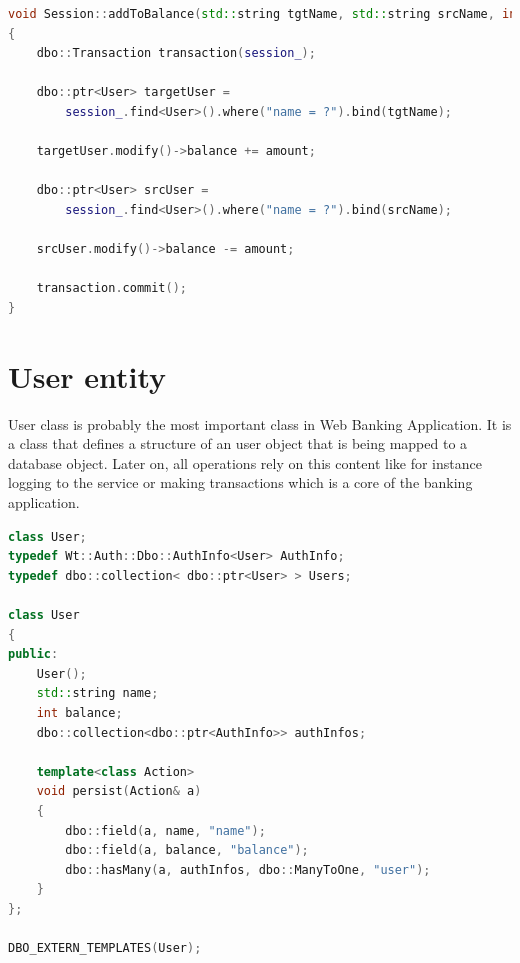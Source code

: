 \documentclass[a4paper,12pt]{book}
\newcommand\tab[1][1cm]{\hspace*{#1}}
\begin{document}
{\bigskip
\begin{lstlisting}[frame=single, basicstyle=\small, language=C++, caption={Session::addToBalance() method.}, captionpos=b]
void Session::addToBalance(std::string tgtName, std::string srcName, int amount)
{
	dbo::Transaction transaction(session_);

	dbo::ptr<User> targetUser = 
		session_.find<User>().where("name = ?").bind(tgtName);

	targetUser.modify()->balance += amount;

	dbo::ptr<User> srcUser = 
		session_.find<User>().where("name = ?").bind(srcName);

	srcUser.modify()->balance -= amount;

	transaction.commit();
}
\end{lstlisting}

}
\section{User entity}
{
\tab User class is probably the most important class in Web Banking Application. It is a class that defines a structure of an user object that is being mapped to a database object. Later on, all operations rely on this content like for instance logging to the service or making transactions which is a core of the banking application.

\bigskip
\begin{lstlisting}[frame=single, basicstyle=\small, language=C++, caption={User class.}, captionpos=b]
class User;
typedef Wt::Auth::Dbo::AuthInfo<User> AuthInfo;
typedef dbo::collection< dbo::ptr<User> > Users;

class User
{
public:
	User();
    std::string name;
    int balance;
    dbo::collection<dbo::ptr<AuthInfo>> authInfos;

    template<class Action>
    void persist(Action& a)
    {
        dbo::field(a, name, "name");
        dbo::field(a, balance, "balance");
        dbo::hasMany(a, authInfos, dbo::ManyToOne, "user");
    }
};

DBO_EXTERN_TEMPLATES(User);
\end{lstlisting}
}
\end{document}
